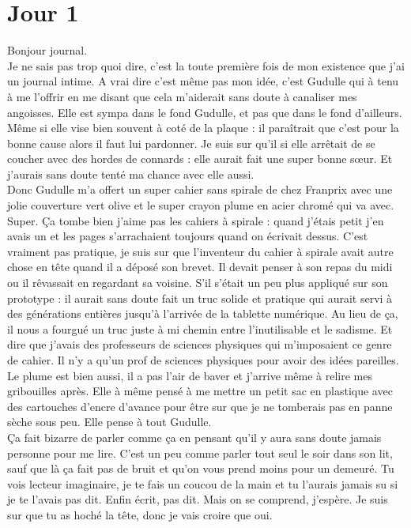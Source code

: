 \chapter*{Jour 1}
Bonjour journal.\\

Je ne sais pas trop quoi dire, c'est la toute première fois de mon existence que j'ai un journal intime. A vrai dire c'est même pas mon idée, c'est Gudulle qui à tenu à me l'offrir en me disant que cela m'aiderait sans doute à canaliser mes angoisses. Elle est sympa dans le fond Gudulle, et pas que dans le fond d'ailleurs. Même si elle vise bien souvent à coté de la plaque : il paraîtrait que c'est pour la bonne cause alors il faut lui pardonner. Je suis sur qu'il si elle arrêtait de se coucher avec des hordes de connards : elle aurait fait une super bonne sœur. Et j'aurais sans doute tenté ma chance avec elle aussi. \\
Donc Gudulle m'a offert un super cahier sans spirale de chez Franprix avec une jolie couverture vert olive et le super crayon plume en acier chromé qui va avec. Super. Ça tombe bien j'aime pas les cahiers à spirale : quand j'étais petit j'en avais un et les pages s'arrachaient toujours quand on écrivait dessus. C'est vraiment pas pratique, je suis sur que l'inventeur du cahier à spirale avait autre chose en tête quand il a déposé son brevet. Il devait penser à son repas du midi ou il rêvassait en regardant sa voisine. S'il s'était un peu plus appliqué sur son prototype : il aurait sans doute fait un truc solide et pratique qui aurait servi à des générations entières jusqu’à l'arrivée de la tablette numérique. Au lieu de ça, il nous a fourgué un truc juste à mi chemin entre l'inutilisable et le sadisme. Et dire que j'avais des professeurs de sciences physiques qui m'imposaient ce genre de cahier. Il n'y a qu'un prof de sciences physiques pour avoir des idées pareilles.\\
Le plume est bien aussi, il a pas l'air de baver et j'arrive même à relire mes gribouilles après. Elle à même pensé à me mettre un petit sac en plastique avec des cartouches d'encre d'avance pour être sur que je ne tomberais pas en panne sèche sous peu. Elle pense à tout Gudulle. \\

Ça fait bizarre de parler comme ça en pensant qu'il y aura sans doute jamais personne pour me lire. C'est un peu comme parler tout seul le soir dans son lit, sauf que là ça fait pas de bruit et qu'on vous prend moins pour un demeuré. Tu vois lecteur imaginaire, je te fais un coucou de la main et tu l'aurais jamais su si je te l'avais pas dit. Enfin écrit, pas dit. Mais on se comprend, j'espère. Je suis sur que tu as hoché la tête, donc je vais croire que oui.\\

